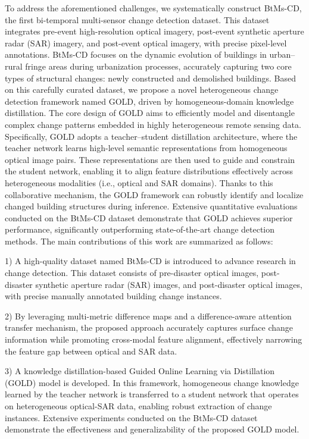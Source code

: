 \documentclass[a4paper,fleqn]{cas-dc}
\begin{document}
To address the aforementioned challenges, we systematically construct BtMs-CD, the first bi-temporal multi-sensor change detection dataset. This dataset integrates pre-event high-resolution optical imagery, post-event synthetic aperture radar (SAR) imagery, and post-event optical imagery, with precise pixel-level annotations. BtMs-CD focuses on the dynamic evolution of buildings in urban–rural fringe areas during urbanization processes, accurately capturing two core types of structural changes: newly constructed and demolished buildings. Based on this carefully curated dataset, we propose a novel heterogeneous change detection framework named GOLD, driven by homogeneous-domain knowledge distillation. The core design of GOLD aims to efficiently model and disentangle complex change patterns embedded in highly heterogeneous remote sensing data. Specifically, GOLD adopts a teacher–student distillation architecture, where the teacher network learns high-level semantic representations from homogeneous optical image pairs. These representations are then used to guide and constrain the student network, enabling it to align feature distributions effectively across heterogeneous modalities (i.e., optical and SAR domains). Thanks to this collaborative mechanism, the GOLD framework can robustly identify and localize changed building structures during inference. Extensive quantitative evaluations conducted on the BtMs-CD dataset demonstrate that GOLD achieves superior performance, significantly outperforming state-of-the-art change detection methods. The main contributions of this work are summarized as follows:

1) A high-quality dataset named BtMs-CD is introduced to advance research in change detection. This dataset consists of pre-disaster optical images, post-disaster synthetic aperture radar (SAR) images, and post-disaster optical images, with precise manually annotated building change instances.

2) By leveraging multi-metric difference maps and a difference-aware attention transfer mechanism, the proposed approach accurately captures surface change information while promoting cross-modal feature alignment, effectively narrowing the feature gap between optical and SAR data.

3) A knowledge distillation-based Guided Online Learning via Distillation (GOLD) model is developed. In this framework, homogeneous change knowledge learned by the teacher network is transferred to a student network that operates on heterogeneous optical-SAR data, enabling robust extraction of change instances. Extensive experiments conducted on the BtMs-CD dataset demonstrate the effectiveness and generalizability of the proposed GOLD model.
\end{document}
